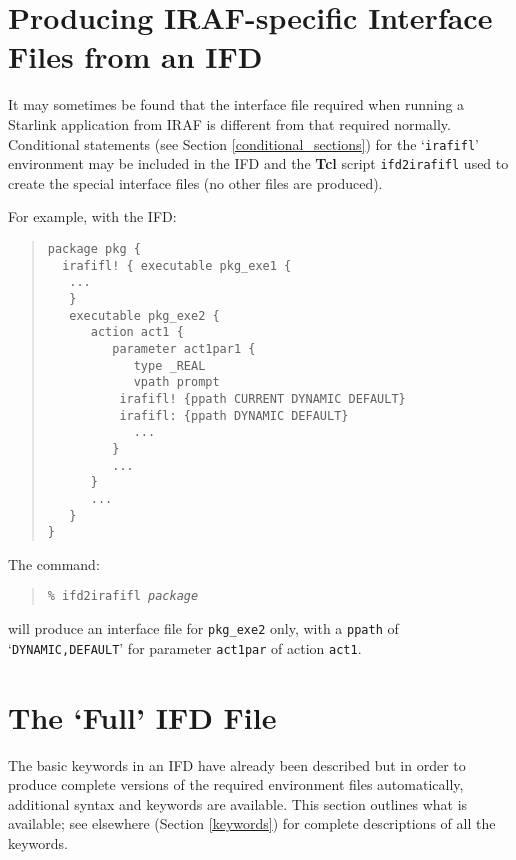 \documentclass[twoside,11pt]{article}
\newcommand{\htmlref}[2]{#1}
\newcommand{\xlabel}[1]{}
\newcommand{\latex}[1]{#1}
\begin{document}
\section{\label{ifd2irafifl}\xlabel{producing_irafspecific_interface_files_from_an_ifd}Producing
IRAF-specific Interface Files from an IFD}
It may sometimes be found that the interface file required when running a
Starlink application from IRAF is different from that required normally.
\htmlref{Conditional statements}{conditional_sections}\latex{ (see Section
\ref{conditional_sections})} for the `\texttt{irafifl}' environment may be
included in the IFD and the \textbf{Tcl} script \texttt{ifd2irafifl} used to
create the special interface files (no other files are produced).

For example, with the IFD:
\begin{quote} \begin{verbatim}
package pkg {
  irafifl! { executable pkg_exe1 {
   ...
   }
   executable pkg_exe2 {
      action act1 {
         parameter act1par1 {
            type _REAL
            vpath prompt
          irafifl! {ppath CURRENT DYNAMIC DEFAULT}
          irafifl: {ppath DYNAMIC DEFAULT}
            ...
         }
         ...
      }
      ...
   }
}
\end{verbatim} \end{quote}
The command:
\begin{quote}
\texttt{\% ifd2irafifl \textit{package}}
\end{quote}
will produce an interface file for \texttt{pkg\_exe2} only, with a
\texttt{ppath} of `\texttt{DYNAMIC,DEFAULT}' for parameter \texttt{act1par} of
action \texttt{act1}.

\section{\xlabel{the_full_ifd_file}\label{IFD_file}The `Full' IFD File}
The basic keywords in an IFD have already been described but in order to
produce complete versions of the required environment files automatically,
additional syntax and keywords are available.
This section outlines what is available; see elsewhere
\latex{(Section \ref{keywords}) } for
\htmlref{complete descriptions}{keywords} of all the keywords.
\end{document}
